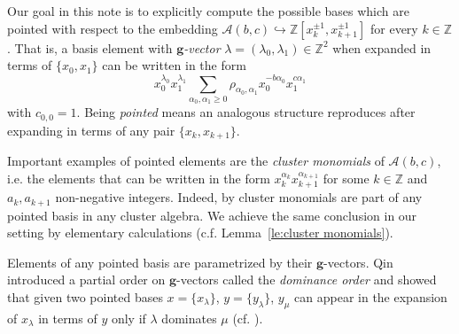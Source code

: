\documentclass{amsart}
\numberwithin{theorem}{section}
\newcommand{\bfg}{\boldsymbol{g}}
\newcommand{\cA}{\mathcal{A}}
\newcommand{\ZZ}{\mathbb{Z}}
\newcommand{\into}{\hookrightarrow}
\begin{document}
  Our goal in this note is to explicitly compute the possible bases which are pointed with respect to the embedding $\cA(b,c)\into\ZZ[x_k^{\pm1},x_{k+1}^{\pm1}]$ for every $k\in\ZZ$.
  That is, a basis element with \emph{$\bfg$-vector} $\lambda=(\lambda_0,\lambda_1)\in\ZZ^2$ when expanded in terms of $\{x_0,x_1\}$ can be written in the form
  \begin{equation}
    \label{eq:pointed}
    x_0^{\lambda_0}x_1^{\lambda_1}\sum\limits_{\alpha_0,\alpha_1 \ge 0} \rho_{\alpha_0,\alpha_1} x_0^{-b\alpha_0} x_1^{c\alpha_1}
  \end{equation}
  with $c_{0,0}=1$.
  Being \emph{pointed} means an analogous structure reproduces after expanding in terms of any pair $\{x_k,x_{k+1}\}$.

  Important examples of pointed elements are the \emph{cluster monomials} of $\cA(b,c)$, i.e. the elements that can be written in the form $x_k^{\alpha_k}x_{k+1}^{\alpha_{k+1}}$ for some $k\in\ZZ$ and $a_k,a_{k+1}$ non-negative integers.
  Indeed, by \cite[Lemma 3.4.12]{qin} cluster monomials are part of any pointed basis in any cluster algebra.
  We achieve the same conclusion in our setting by elementary calculations (c.f. Lemma~\ref{le:cluster monomials}).

  Elements of any pointed basis are parametrized by their $\bfg$-vectors.
  Qin introduced a partial order on $\bfg$-vectors called the \emph{dominance order} and showed that given two pointed bases $x=\{x_\lambda\}$, $y=\{y_\lambda\}$, $y_\mu$ can appear in the expansion of $x_\lambda$ in terms of $y$ only if $\lambda$ dominates $\mu$ (cf. \cite[Theorem 1.2.1]{qin}).
\end{document}
